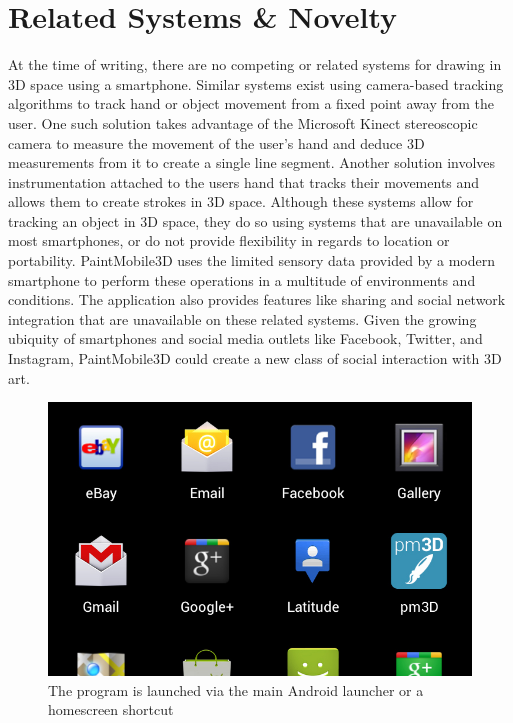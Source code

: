 \documentclass{chi-ext}
\begin{document}
\section{Related Systems \& Novelty}

At the time of writing, there are no competing or related systems for drawing in 3D space using a smartphone. Similar systems exist using camera-based tracking algorithms to track hand or object movement from a fixed point away from the user. One such solution takes advantage of the Microsoft Kinect stereoscopic camera to measure the movement of the user’s hand and deduce 3D measurements from it to create a single line segment. Another solution involves instrumentation attached to the users hand that tracks their movements and allows them to create strokes in 3D space. Although these systems allow for tracking an object in 3D space, they do so using systems that are unavailable on most smartphones, or do not provide flexibility in regards to location or portability. PaintMobile3D uses the limited sensory data provided by a modern smartphone to perform these operations in a multitude of environments and conditions. The application also provides features like sharing and social network integration that are unavailable on these related systems. Given the growing ubiquity of smartphones and social media outlets like Facebook, Twitter, and Instagram, PaintMobile3D could create a new class of social interaction with 3D art. \cite{brooks1997determining} \cite{schkolne2002drawing} \cite{voigt2011robust} \cite{hol2007robust}

\begin{figure}
\parbox{\columnwidth}{
  \centering
  \includegraphics[width=\columnwidth]{icon.jpg}
  \caption{The program is launched via the main Android launcher or a homescreen shortcut}
  \label{fig:icon}
}
\end{figure}
\end{document}
